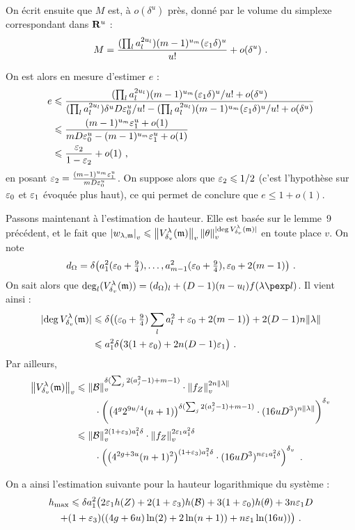 \documentclass[11pt, twoside, a4paper, draft]{article}
\theoremstyle{definition}
\begin{document}
On écrit ensuite que $M$ est, à $o(\delta^u)$ près, donné par le volume du
simplexe correspondant dans $\mathbf{R}^u$ :
\[
  M = \frac{
    (\prod_l a_l^{2u_l}) (m-1)^{u_m} (\varepsilon_1 \delta)^u}{
    u!}
  + o(\delta^u) \text{ .}
\]

On est alors en mesure d'estimer $e$ :
\begin{align*}
  e 
  & \leqslant \frac{
      (\prod_l a_l^{2u_l}) (m-1)^{u_m} (\varepsilon_1 \delta)^u / u! + o(\delta^u)}{
      (\prod_l a_l^{2u_l}) \delta^u D \varepsilon_0^u / u! 
      - (\prod_l a_l^{2u_l}) (m-1)^{u_m} (\varepsilon_1 \delta)^u / u! +o(\delta^u)} \\
  & \leqslant \frac{
      (m-1)^{u_m} \varepsilon_1^u + o(1)}{
      mD\varepsilon_0^u - (m-1)^{u_m} \varepsilon_1^u + o(1)} \\
  & \leqslant \frac {\varepsilon_2} {1 - \varepsilon_2} + o(1) \text{ ,}
\end{align*}
en posant $\varepsilon_2 = \frac {(m-1)^{u_m} \varepsilon_1^u} {m D\varepsilon_0^u}$. On
suppose alors que $\varepsilon_2 \leqslant 1/2$ (c'est l'hypothèse sur $\varepsilon_0$ et $\varepsilon_1$
évoquée plus haut), ce qui permet de conclure que $e \le 1 + o(1)$.

Passons maintenant à l'estimation de hauteur. Elle est basée sur le lemme~9
précédent, et le fait que $\left\lvert w_{\lambda, {\mathfrak m}}\right\rvert_{v} \leqslant
\left\lVert V_{\delta\smash{_v}}^\lambda({\mathfrak m})\right\rVert_{v} \left\lVert\theta\right\rVert_{v}^{{\lvert\deg V_ {\delta\smash{_v}}^{\lambda}({\mathfrak m})\rvert}}$ en
toute place $v$. On note 
\[
  d_\Omega = \delta \bigl(a_1^2 (\varepsilon_0 + \tfrac94), \ldots, 
  a_{m-1}^2 (\varepsilon_0 + \tfrac94), \varepsilon_0 + 2(m-1) \bigl) \text{ .}
\]
On sait alors que $\deg_l(V_\dv^\lambda(\monome)) = (d_\Omega)_l + 
(D-1) (n-u_l) f(\lambda\pexp l)$. Il vient ainsi :
\begin{align*}
  {\lvert\deg V_ {\delta\smash{_v}}^{\lambda}({\mathfrak m})\rvert} 
  & \leqslant \delta \bigl( (\varepsilon_0 + \tfrac94) \sum_l a_l^2 + \varepsilon_0 + 2(m-1) \bigr)
    + 2(D-1) n\lVert\lambda\rVert \\
  & \leqslant a_1^2 \delta \bigl( 3(1+\varepsilon_0) + 2n (D-1) \varepsilon_1 \bigr) \text{ .}
\end{align*}
Par ailleurs,
\begin{align*}
  \left\lVert V_{\delta\smash{_v}}^\lambda({\mathfrak m})\right\rVert_{v} 
  & \leqslant \left\lVert\mathcal B\right\rVert_{v} ^{\delta(\sum_j 2(a_j^2 -1) + m-1)} \cdot \left\lVert f_Z\right\rVert_{v}^{2n\lVert\lambda\rVert}
    \\ & \qquad \cdot \left( 
    \bigl( 4^g 2^{9u/4} (n+1) \bigr)^{\delta(\sum_j 2(a_j^2-1) + m-1)}
    \cdot (16uD^3)^{n\lVert\lambda\rVert}
    \right)^{\delta\smash{_v}} \\
  & \leqslant \left\lVert\mathcal B\right\rVert_{v} ^{2(1+\varepsilon_3) a_1^2\delta} \cdot \left\lVert f_Z\right\rVert_{v}^{2\varepsilon_1 a_1^2\delta}
    \\ & \qquad \cdot \left(
    \bigl( 4^{2g+3u} (n+1)^2 \bigr)^{(1+\varepsilon_3) a_1^2\delta}
    \cdot (16uD^3)^{n\varepsilon_1 a_1^2\delta}
    \right)^{\delta\smash{_v}} \text{ .}
\end{align*}

On a ainsi l'estimation suivante  pour la hauteur logarithmique du système : 
\begin{multline*}
  h_{\mathrm{max}} \leqslant \delta a_1^2 \bigl( 2\varepsilon_1 h(Z) + 2(1+\varepsilon_3) h(\mathcal B) 
  + 3(1+\varepsilon_0) h(\theta)  + 3n\varepsilon_1D  \\ + (1+\varepsilon_3)((4g+6u)\ln(2)
  + 2\ln(n+1)) + n\varepsilon_1\ln(16u)) \bigr) \text{ .}
\end{multline*}
\end{document}
